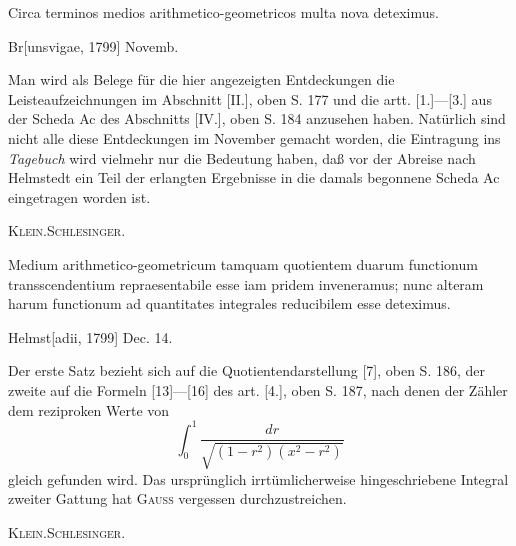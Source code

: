 \indent Circa terminos medios arithmetico-geometricos multa nova deteximus.
\par\noindent\hfill Br[unsvigae, 1799] Novemb.

\medskip\begingroup\small
\indent Man wird als Belege für die hier angezeigten Entdeckungen die Leisteaufzeichnungen im Abschnitt [II.], oben S. 177 und die artt. [1.]—[3.] aus der Scheda Ac des Abschnitts [IV.], oben S. 184 anzusehen haben. Natürlich sind nicht alle diese Entdeckungen im November gemacht worden, die Eintragung ins \textit{Tagebuch} wird vielmehr nur die Bedeutung haben, daß vor der Abreise nach Helmstedt ein Teil der erlangten Ergebnisse in die damals begonnene Scheda Ac eingetragen worden ist.
\par\noindent\hfill\textsc{Klein.\quad Schlesinger.}
\par\endgroup

\indent Medium arithmetico-geometricum tamquam quotientem duarum functionum transscendentium repraesentabile esse iam pridem inveneramus; nunc alteram harum functionum ad quantitates integrales reducibilem esse deteximus.
\par\noindent\hfill Helmst[adii, 1799] Dec. 14.

\medskip\begingroup\small
\indent Der erste Satz bezieht sich auf die Quotientendarstellung [7], oben S. 186, der zweite auf die Formeln [13]—[16] des art. [4.], oben S. 187, nach denen der Zähler dem reziproken Werte von
\[
\int_0^1\frac{dr}{\sqrt{(1-r^2)(x^2-r^2)}}
\]
\noindent gleich gefunden wird. Das ursprünglich irrtümlicherweise hingeschriebene Integral zweiter Gattung hat \textsc{Gauss} vergessen durchzustreichen.
\par\noindent\hfill\textsc{Klein.\quad Schlesinger.}
\par\endgroup
